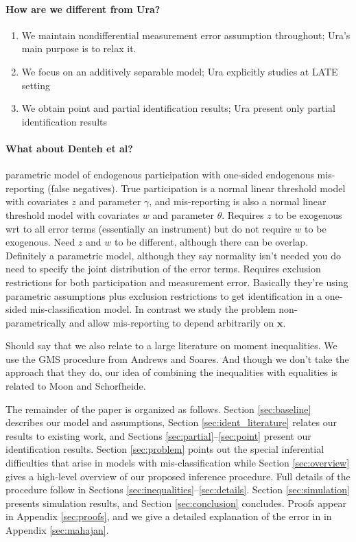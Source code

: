 \paragraph{How are we different from Ura?}
\begin{enumerate}
  \item We maintain nondifferential measurement error assumption throughout; Ura's main purpose is to relax it.
  \item We focus on an additively separable model; Ura explicitly studies at LATE setting
  \item We obtain point and partial identification results; Ura present only partial identification results
\end{enumerate}

\paragraph{What about Denteh et al?}
\cite{nguimkeu2016estimation} parametric model of endogenous participation with one-sided endogenous mis-reporting (false negatives).
True participation is a normal linear threshold model with covariates $z$ and parameter $\gamma$, and mis-reporting is also a normal linear threshold model with covariates $w$ and parameter $\theta$.
Requires $z$ to be exogenous wrt to all error terms (essentially an instrument) but do not require $w$ to be exogenous.
Need $z$ and $w$ to be different, although there can be overlap.
Definitely a parametric model, although they say normality isn't needed you do need to specify the joint distribution of the error terms.
Requires exclusion restrictions for both participation and measurement error.
Basically they're using parametric assumptions plus exclusion restrictions to get identification in a one-sided mis-classification model.
In contrast we study the problem non-parametrically and allow mis-reporting to depend arbitrarily on $\mathbf{x}$.

Should say that we also relate to a large literature on moment inequalities.
We use the GMS procedure from Andrews and Soares.
And though we don't take the approach that they do, our idea of combining the inequalities with equalities is related to Moon and Schorfheide.


The remainder of the paper is organized as follows.
Section \ref{sec:baseline} describes our model and assumptions, Section \ref{sec:ident_literature} relates our results to existing work, and Sections \ref{sec:partial}--\ref{sec:point} present our identification results.
Section \ref{sec:problem} points out the special inferential difficulties that arise in models with mis-classification while Section \ref{sec:overview} gives a high-level overview of our proposed inference procedure.
Full details of the procedure follow in Sections \ref{sec:inequalities}--\ref{sec:details}.
Section \ref{sec:simulation} presents simulation results, and Section \ref{sec:conclusion} concludes.
Proofs appear in Appendix \ref{sec:proofs}, and we give a detailed explanation of the error in \cite{Mahajan} in Appendix \ref{sec:mahajan}.


